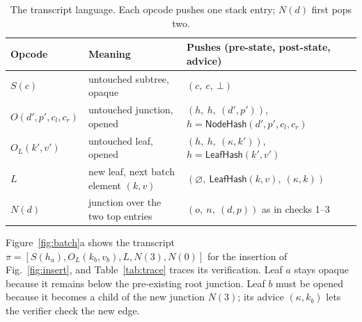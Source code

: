 \documentclass[runningheads]{llncs}
\newcommand{\LeafHash}{\mathsf{LeafHash}}
\newcommand{\NodeHash}{\mathsf{NodeHash}}
\begin{document}
\begin{table}[t]
\centering
\caption{The transcript language. Each opcode pushes one stack entry; $N(d)$ first pops two.}\label{tab:lang}
\footnotesize
\setlength{\tabcolsep}{4pt}
\begin{tabular}{@{}l l l@{}}
\toprule
Opcode & Meaning & Pushes (pre-state, post-state, advice) \\
\midrule
$S(c)$ & untouched subtree, opaque & $(c,\ c,\ \bot)$ \\
$O(d',p',c_l,c_r)$ & untouched junction, opened & $(h,\ h,\ (d',p'))$, $h = \NodeHash(d',p',c_l,c_r)$ \\
$O_L(k',v')$ & untouched leaf, opened & $(h,\ h,\ (\kappa,k'))$, $h = \LeafHash(k',v')$ \\
$L$ & new leaf, next batch element $(k,v)$ & $(\varnothing,\ \LeafHash(k,v),\ (\kappa,k))$ \\
$N(d)$ & junction over the two top entries & $(o,\ n,\ (d,p))$ as in checks 1--3 \\
\bottomrule
\end{tabular}
\end{table}

Figure~\ref{fig:batch}a shows the transcript $\pi = [S(h_a), O_L(k_b,v_b), L, N(3), N(0)]$ for the insertion of Fig.~\ref{fig:insert}, and Table~\ref{tab:trace} traces its verification.
Leaf $a$ stays opaque because it remains below the pre-existing root junction. Leaf $b$ must be opened because it becomes a child of the new junction $N(3)$; its advice $(\kappa,k_b)$ lets the verifier check the new edge.
\end{document}
